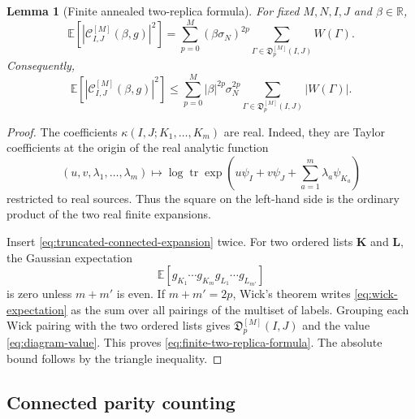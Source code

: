 \documentclass[11pt]{article}
\newtheorem{lemma}[theorem]{Lemma}
\newcommand{\E}{\mathbb{E}}
\newcommand{\tr}{\operatorname{tr}}
\newcommand{\R}{\mathbb{R}}
\begin{document}
\begin{lemma}[Finite annealed two-replica formula]
  \label{lem:finite-two-replica-formula}
  For fixed $M,N,I,J$ and $\beta\in\R$,
  \begin{equation}\label{eq:finite-two-replica-formula}
    \E\left[
      \left|
        \mathcal C^{[M]}_{I,J}(\beta,g)
      \right|^2
    \right]
    =
    \sum_{p=0}^M
    (\beta\sigma_N)^{2p}
    \sum_{\Gamma\in\mathfrak D_p^{[M]}(I,J)}
    W(\Gamma).
  \end{equation}
  Consequently,
  \begin{equation}\label{eq:absolute-finite-two-replica-formula}
    \E\left[
      \left|
        \mathcal C^{[M]}_{I,J}(\beta,g)
      \right|^2
    \right]
    \leq
    \sum_{p=0}^M
    |\beta|^{2p}\sigma_N^{2p}
    \sum_{\Gamma\in\mathfrak D_p^{[M]}(I,J)}
    |W(\Gamma)|.
  \end{equation}
\end{lemma}

\begin{proof}
  The coefficients $\kappa(I,J;K_1,\ldots,K_m)$ are real.  Indeed, they are
  Taylor coefficients at the origin of the real analytic function
  \begin{equation}\label{eq:kappa-real-valued}
    (u,v,\lambda_1,\ldots,\lambda_m)
    \mapsto
    \log\tr\exp\left(
      u\psi_I+v\psi_J+\sum_{a=1}^m\lambda_a\psi_{K_a}
    \right)
  \end{equation}
  restricted to real sources.  Thus the square on the left-hand side is the
  ordinary product of the two real finite expansions.

  Insert \eqref{eq:truncated-connected-expansion} twice.  For two ordered lists
  $\mathbf K$ and $\mathbf L$, the Gaussian expectation
  \begin{equation}\label{eq:wick-expectation}
    \E\left[g_{K_1}\cdots g_{K_m}g_{L_1}\cdots g_{L_{m'}}\right]
  \end{equation}
  is zero unless $m+m'$ is even.  If $m+m'=2p$, Wick's theorem writes
  \eqref{eq:wick-expectation} as the sum over all pairings of the multiset of
  labels.  Grouping each Wick pairing with the two ordered lists gives
  $\mathfrak D_p^{[M]}(I,J)$ and the value \eqref{eq:diagram-value}.  This
  proves \eqref{eq:finite-two-replica-formula}.  The absolute bound follows by
  the triangle inequality.

\end{proof}

\subsection{Connected parity counting}
\end{document}
